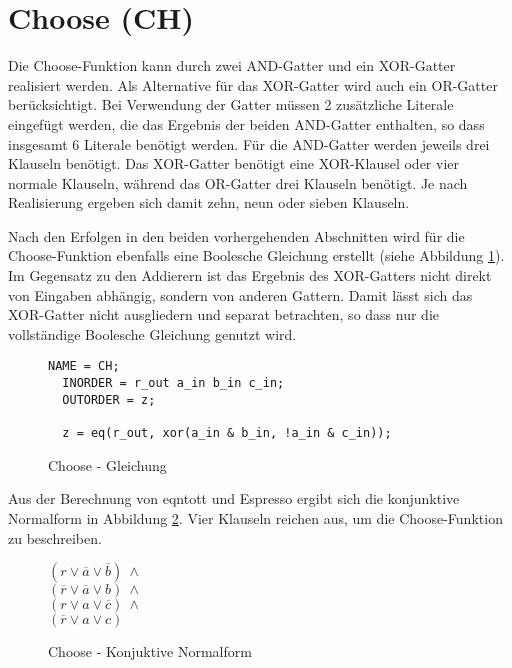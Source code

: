 \section{Choose (CH)}
\label{sec:knf:ch}

Die Choose-Funktion kann durch zwei AND-Gatter und ein XOR-Gatter realisiert werden. Als Alternative für das XOR-Gatter wird auch ein OR-Gatter berücksichtigt.
Bei Verwendung der Gatter müssen 2 zusätzliche Literale eingefügt werden, die das Ergebnis der beiden AND-Gatter enthalten, so dass insgesamt 6 Literale benötigt werden.
Für die AND-Gatter werden jeweils drei Klauseln benötigt. Das XOR-Gatter benötigt eine XOR-Klausel oder vier normale Klauseln, während das OR-Gatter drei Klauseln benötigt.
Je nach Realisierung ergeben sich damit zehn, neun oder sieben Klauseln.

Nach den Erfolgen in den beiden vorhergehenden Abschnitten wird für die Choose-Funktion ebenfalls eine Boolesche Gleichung erstellt (siehe Abbildung \ref{fig:choose_eqn}).
Im Gegensatz zu den Addierern ist das Ergebnis des XOR-Gatters nicht direkt von Eingaben abhängig, sondern von anderen Gattern. Damit lässt sich das XOR-Gatter nicht
ausgliedern und separat betrachten, so dass nur die vollständige Boolesche Gleichung genutzt wird.
\begin{figure}[!h]
  \centering
  \begin{lstlisting}[]
  NAME = CH;
  INORDER = r_out a_in b_in c_in;
  OUTORDER = z;

  z = eq(r_out, xor(a_in & b_in, !a_in & c_in));
  \end{lstlisting}
  \caption{Choose - Gleichung}
  \label{fig:choose_eqn}
\end{figure}

Aus der Berechnung von eqntott und Espresso ergibt sich die konjunktive Normalform in Abbildung \ref{fig:choose_cnf}.
Vier Klauseln reichen aus, um die Choose-Funktion zu beschreiben.
\begin{figure}[!h]
  \centering
  \begin{minipage}[l]{2cm}
    $ (r \vee \overline{a} \vee \overline{b}) ~ \wedge $\\
    $ (\overline{r} \vee \overline{a} \vee b) ~ \wedge $\\
    $ (r \vee a \vee \overline{c}) ~ \wedge $\\
    $ (\overline{r} \vee a \vee c) $
  \end{minipage}
  \caption{Choose - Konjuktive Normalform}
  \label{fig:choose_cnf}
\end{figure}

